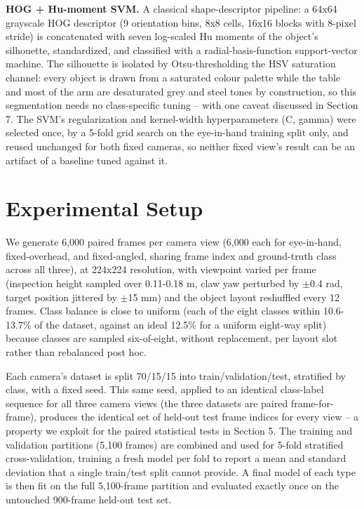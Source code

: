 \documentclass[conference]{IEEEtran}
\begin{document}
\textbf{HOG + Hu-moment SVM.} A classical shape-descriptor pipeline: a 64x64 grayscale HOG descriptor (9 orientation bins, 8x8 cells, 16x16 blocks with 8-pixel stride) is concatenated with seven log-scaled Hu moments of the object's silhouette, standardized, and classified with a radial-basis-function support-vector machine. The silhouette is isolated by Otsu-thresholding the HSV saturation channel: every object is drawn from a saturated colour palette while the table and most of the arm are desaturated grey and steel tones by construction, so this segmentation needs no class-specific tuning -- with one caveat discussed in Section 7. The SVM's regularization and kernel-width hyperparameters (C, gamma) were selected once, by a 5-fold grid search on the eye-in-hand training split only, and reused unchanged for both fixed cameras, so neither fixed view's result can be an artifact of a baseline tuned against it.

\section{Experimental Setup}

We generate 6,000 paired frames per camera view (6,000 each for eye-in-hand, fixed-overhead, and fixed-angled, sharing frame index and ground-truth class across all three), at 224x224 resolution, with viewpoint varied per frame (inspection height sampled over 0.11-0.18 m, claw yaw perturbed by $\pm$0.4 rad, target position jittered by $\pm$15 mm) and the object layout reshuffled every 12 frames. Class balance is close to uniform (each of the eight classes within 10.6-13.7\% of the dataset, against an ideal 12.5\% for a uniform eight-way split) because classes are sampled six-of-eight, without replacement, per layout slot rather than rebalanced post hoc.

Each camera's dataset is split 70/15/15 into train/validation/test, stratified by class, with a fixed seed. This same seed, applied to an identical class-label sequence for all three camera views (the three datasets are paired frame-for-frame), produces the identical set of held-out test frame indices for every view -- a property we exploit for the paired statistical tests in Section 5. The training and validation partitions (5,100 frames) are combined and used for 5-fold stratified cross-validation, training a fresh model per fold to report a mean and standard deviation that a single train/test split cannot provide. A final model of each type is then fit on the full 5,100-frame partition and evaluated exactly once on the untouched 900-frame held-out test set.
\end{document}
